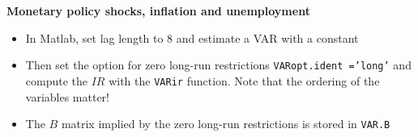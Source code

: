 \begin{frame}
{\textbf{Monetary policy shocks, inflation and unemployment}}\vspace{-.1cm}

\begin{itemize}
\item In Matlab, set lag length to $8$ and estimate a VAR with a constant
\medskip

\begin{minipage}[b]{.9\textwidth}
\end{minipage}

\medskip

\item Then set the option for zero long-run restrictions %
\colorbox{script!80}{\small\texttt{VARopt.ident ='long'}} and compute the $%
IR $ with the \colorbox{script!80}{\small\texttt{VARir}} function. Note that
the ordering of the variables matter!\medskip

\begin{minipage}[b]{.9\textwidth}
\end{minipage}

\medskip

\item The $B$ matrix implied by the zero long-run restrictions is stored in %
\colorbox{script!80}{\small\texttt{VAR.B}}
\end{itemize}
\end{frame}

